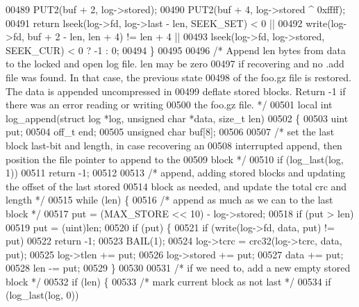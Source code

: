 \begin{DoxyCode}
00489     PUT2(buf + 2, log->stored);
00490     PUT2(buf + 4, log->stored ^ 0xffff);
00491     \textcolor{keywordflow}{return} lseek(log->fd, log->last - len, SEEK\_SET) < 0 ||
00492            write(log->fd, buf + 2 - len, len + 4) != len + 4 ||
00493            lseek(log->fd, log->stored, SEEK\_CUR) < 0 ? -1 : 0;
00494 \}
00495 
00496 \textcolor{comment}{/* Append len bytes from data to the locked and open log file.  len may be zero}
00497 \textcolor{comment}{   if recovering and no .add file was found.  In that case, the previous state}
00498 \textcolor{comment}{   of the foo.gz file is restored.  The data is appended uncompressed in}
00499 \textcolor{comment}{   deflate stored blocks.  Return -1 if there was an error reading or writing}
00500 \textcolor{comment}{   the foo.gz file. */}
00501 local \textcolor{keywordtype}{int} log\_append(\textcolor{keyword}{struct} log *log, \textcolor{keywordtype}{unsigned} \textcolor{keywordtype}{char} *data, \textcolor{keywordtype}{size\_t} len)
00502 \{
00503     uint put;
00504     off\_t end;
00505     \textcolor{keywordtype}{unsigned} \textcolor{keywordtype}{char} buf[8];
00506 
00507     \textcolor{comment}{/* set the last block last-bit and length, in case recovering an}
00508 \textcolor{comment}{       interrupted append, then position the file pointer to append to the}
00509 \textcolor{comment}{       block */}
00510     \textcolor{keywordflow}{if} (log\_last(log, 1))
00511         \textcolor{keywordflow}{return} -1;
00512 
00513     \textcolor{comment}{/* append, adding stored blocks and updating the offset of the last stored}
00514 \textcolor{comment}{       block as needed, and update the total crc and length */}
00515     \textcolor{keywordflow}{while} (len) \{
00516         \textcolor{comment}{/* append as much as we can to the last block */}
00517         put = (MAX\_STORE << 10) - log->stored;
00518         if (put > len)
00519             put = (uint)len;
00520         \textcolor{keywordflow}{if} (put) \{
00521             \textcolor{keywordflow}{if} (write(log->fd, data, put) != put)
00522                 \textcolor{keywordflow}{return} -1;
00523             BAIL(1);
00524             log->tcrc = crc32(log->tcrc, data, put);
00525             log->tlen += put;
00526             log->stored += put;
00527             data += put;
00528             len -= put;
00529         \}
00530 
00531         \textcolor{comment}{/* if we need to, add a new empty stored block */}
00532         \textcolor{keywordflow}{if} (len) \{
00533             \textcolor{comment}{/* mark current block as not last */}
00534             \textcolor{keywordflow}{if} (log\_last(log, 0))

\end{DoxyCode}
